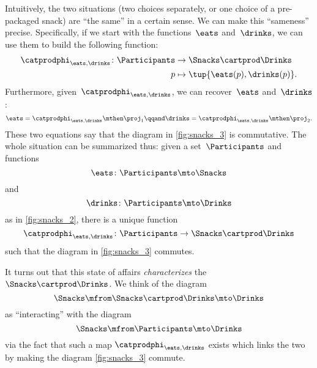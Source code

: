 Intuitively, the two situations (two choices separately, or one choice of a pre-packaged snack) are ``the same'' in a certain sense.
We can make this ``sameness'' precise.
Specifically, if we start with the functions~$\eats$ and~$\drinks$, we can use them to build the following function:
\begin{equation}
    \label{eq:snacks-building-univ-map}
    \begin{aligned}
        \catprodphi_{\eats,\drinks}\colon \Participants & \to \Snacks\cartprod \Drinks \\
        p                                               & \mapsto \tup{\eats(p),\drinks(p)}.
    \end{aligned}
\end{equation}
Furthermore, given~$\catprodphi_{\eats,\drinks}$, we can recover~$\eats$ and~$\drinks$:
\begin{equation}
    \label{eq:snacks-proj-univ-map}
    \eats =\catprodphi_{\eats,\drinks}\mthen \proj_1 \qqand \drinks=\catprodphi_{\eats,\drinks}\mthen \proj_2.
\end{equation}
These two equations say that the diagram in \cref{fig:snacks_3} is commutative.
The whole situation can be summarized thus: given a set~$\Participants$ and functions
\begin{equation}
    \eats\colon \Participants \mto \Snacks
\end{equation}
and
\begin{equation}
    \drinks\colon \Participants \mto \Drinks
\end{equation}
as in \cref{fig:snacks_2}, there is a unique function
\begin{equation}
    \label{eq:snacks-unique-univ-map}
    \catprodphi_{\eats,\drinks} \colon \Participants \to \Snacks \cartprod \Drinks
\end{equation}
such that the diagram in \cref{fig:snacks_3} commutes.

\begin{figure*}[h!]
    \centering
    \caption{Choosing food and drink separately is essentially the same as choosing a combination of the two. }
    \label{fig:snacks_3}
\end{figure*}

It turns out that this state of affairs \emph{characterizes} the  $\Snacks\cartprod \Drinks$.
We think of the diagram
%
\begin{equation}
    \label{eq:snacks-prod-diagram}
    \Snacks \mfrom \Snacks \cartprod \Drinks \mto \Drinks
\end{equation}
as ``interacting'' with the diagram
\begin{equation}
    \label{eq:snacks-prod-test-diagram}
    \Snacks \mfrom  \Participants \mto \Drinks
\end{equation}
via the fact that such a map $\catprodphi_{\eats,\drinks}$ exists which links the two by making the diagram \cref{fig:snacks_3} commute.

